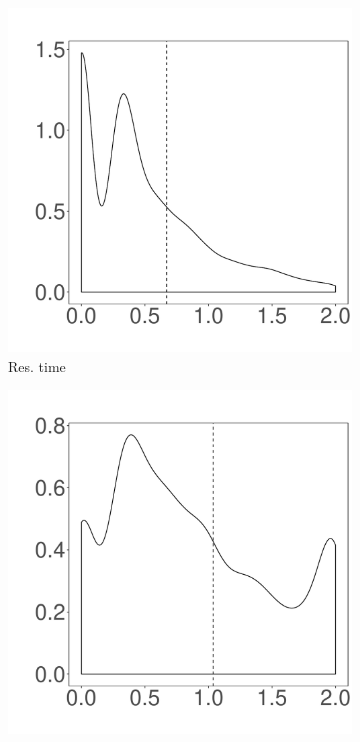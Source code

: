 \documentclass[10pt,journal,compsoc]{IEEEtran}
\begin{document}
\begin{figure}%
	\centering
        \begin{subfigure}{0.19\textwidth}
                \includegraphics[width=\linewidth]{Figures/runtime-cassandra-cluster.pdf}
                \caption{Res. time}
        \end{subfigure}%
        \begin{subfigure}{0.19\textwidth}
                \includegraphics[width=\linewidth]{Figures/cpu-cassandra-cluster.pdf}

\end{subfigure}
\end{figure}
\end{document}
